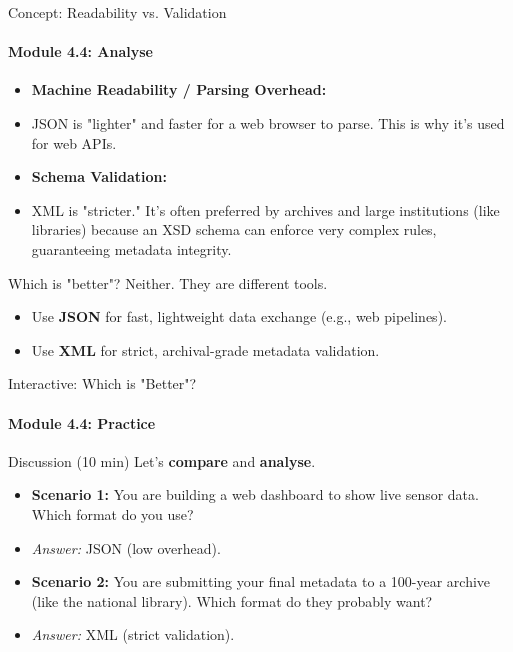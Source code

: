 \begin{frame}{Concept: Readability vs. Validation}
    \framesubtitle{Module 4.4: Analyse}
    \begin{itemize}
        \item \textbf{Machine Readability / Parsing Overhead:}
        \item JSON is "lighter" and faster for a web browser to parse. This is why it's used for web APIs.
        \pause
        \item \textbf{Schema Validation:}
        \item XML is "stricter." It's often preferred by archives and large institutions (like libraries) because an XSD schema can enforce very complex rules, guaranteeing metadata integrity.
    \end{itemize}
    \pause
    \begin{block}{Which is "better"?}
        Neither. They are different tools.
        \begin{itemize}
            \item Use \textbf{JSON} for fast, lightweight data exchange (e.g., web pipelines).
            \item Use \textbf{XML} for strict, archival-grade metadata validation.
        \end{itemize}
    \end{block}
\end{frame}

\begin{frame}{Interactive: Which is "Better"?}
    \framesubtitle{Module 4.4: Practice}
    \begin{block}{Discussion (10 min)}
        Let's \textbf{compare} and \textbf{analyse}.
        \pause
        \begin{itemize}
            \item \textbf{Scenario 1:} You are building a web dashboard to show live sensor data. Which format do you use?
            \item \emph{Answer:} JSON (low overhead).
            \pause
            \item \textbf{Scenario 2:} You are submitting your final metadata to a 100-year archive (like the national library). Which format do they probably want?
            \item \emph{Answer:} XML (strict validation).
        \end{itemize}
    \end{block}
\end{frame}

